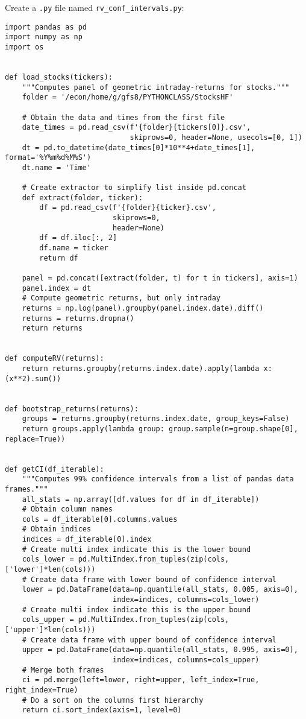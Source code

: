 \documentclass[12pt, a4paper]{article}
\begin{document}
Create a \texttt{.py} file named \texttt{rv\_conf\_intervals.py}:
\lstset{language=jupyter-python,label= ,caption= ,captionpos=b,numbers=none}
\begin{lstlisting}
import pandas as pd
import numpy as np
import os


def load_stocks(tickers):
    """Computes panel of geometric intraday-returns for stocks."""
    folder = '/econ/home/g/gfs8/PYTHONCLASS/StocksHF'

    # Obtain the data and times from the first file
    date_times = pd.read_csv(f'{folder}{tickers[0]}.csv',
                             skiprows=0, header=None, usecols=[0, 1])
    dt = pd.to_datetime(date_times[0]*10**4+date_times[1], format='%Y%m%d%M%S')
    dt.name = 'Time'

    # Create extractor to simplify list inside pd.concat
    def extract(folder, ticker):
        df = pd.read_csv(f'{folder}{ticker}.csv',
                         skiprows=0,
                         header=None)
        df = df.iloc[:, 2]
        df.name = ticker
        return df

    panel = pd.concat([extract(folder, t) for t in tickers], axis=1)
    panel.index = dt
    # Compute geometric returns, but only intraday
    returns = np.log(panel).groupby(panel.index.date).diff()
    returns = returns.dropna()
    return returns


def computeRV(returns):
    return returns.groupby(returns.index.date).apply(lambda x: (x**2).sum())


def bootstrap_returns(returns):
    groups = returns.groupby(returns.index.date, group_keys=False)
    return groups.apply(lambda group: group.sample(n=group.shape[0], replace=True))


def getCI(df_iterable):
    """Computes 99% confidence intervals from a list of pandas data frames."""
    all_stats = np.array([df.values for df in df_iterable])
    # Obtain column names
    cols = df_iterable[0].columns.values
    # Obtain indices
    indices = df_iterable[0].index
    # Create multi index indicate this is the lower bound
    cols_lower = pd.MultiIndex.from_tuples(zip(cols, ['lower']*len(cols)))
    # Create data frame with lower bound of confidence interval
    lower = pd.DataFrame(data=np.quantile(all_stats, 0.005, axis=0),
                         index=indices, columns=cols_lower)
    # Create multi index indicate this is the upper bound
    cols_upper = pd.MultiIndex.from_tuples(zip(cols, ['upper']*len(cols)))
    # Create data frame with upper bound of confidence interval
    upper = pd.DataFrame(data=np.quantile(all_stats, 0.995, axis=0),
                         index=indices, columns=cols_upper)
    # Merge both frames
    ci = pd.merge(left=lower, right=upper, left_index=True, right_index=True)
    # Do a sort on the columns first hierarchy
    return ci.sort_index(axis=1, level=0)
\end{lstlisting}
\end{document}
